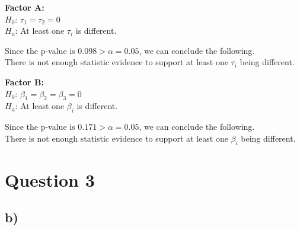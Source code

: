 \documentclass{article}
\begin{document}
\begin{flushleft}
    \textbf{Factor A:}\\
    $H_0$: $\tau_1 = \tau_2 = 0$ \\
    $H_a$: At least one $\tau_i$ is different.\\
\end{flushleft}

Since the p-value is $0.098 > \alpha = 0.05$, we can conclude the following. \\
There is not enough statistic evidence to support at least one $\tau_i$ being different.


\begin{flushleft}
    \textbf{Factor B:} \\
    $H_0$: $\beta_1 = \beta_2 = \beta_3 = 0$ \\
    $H_a$: At least one $\beta_i$ is different.\\
\end{flushleft}

Since the p-value is $0.171 > \alpha = 0.05$, we can conclude the following. \\
There is not enough statistic evidence to support at least one $\beta_i$ being different.

\clearpage
\section*{Question 3}

\subsection*{b)}

\end{document}
